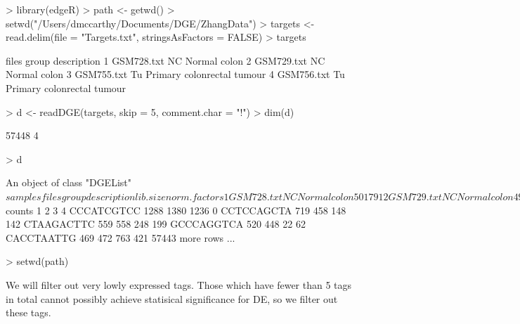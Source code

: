 \begin{Schunk}
\begin{Sinput}
> library(edgeR)
> path <- getwd()
> setwd("/Users/dmccarthy/Documents/DGE/ZhangData")
> targets <- read.delim(file = "Targets.txt", stringsAsFactors = FALSE)
> targets
\end{Sinput}
\begin{Soutput}
       files group                description
1 GSM728.txt    NC               Normal colon
2 GSM729.txt    NC               Normal colon
3 GSM755.txt    Tu Primary colonrectal tumour
4 GSM756.txt    Tu Primary colonrectal tumour
\end{Soutput}
\begin{Sinput}
> d <- readDGE(targets, skip = 5, comment.char = "!")
> dim(d)
\end{Sinput}
\begin{Soutput}
[1] 57448     4
\end{Soutput}
\begin{Sinput}
> d
\end{Sinput}
\begin{Soutput}
An object of class "DGEList"
$samples
       files group                description lib.size norm.factors
1 GSM728.txt    NC               Normal colon    50179            1
2 GSM729.txt    NC               Normal colon    49593            1
3 GSM755.txt    Tu Primary colonrectal tumour    57686            1
4 GSM756.txt    Tu Primary colonrectal tumour    49064            1

$counts
              1    2    3   4
CCCATCGTCC 1288 1380 1236   0
CCTCCAGCTA  719  458  148 142
CTAAGACTTC  559  558  248 199
GCCCAGGTCA  520  448   22  62
CACCTAATTG  469  472  763 421
57443 more rows ...
\end{Soutput}
\begin{Sinput}
> setwd(path)
\end{Sinput}
\end{Schunk}

We will filter out very lowly expressed tags. Those which have fewer
than 5 tags in total cannot possibly achieve statisical significance
for DE, so we filter out these tags.

